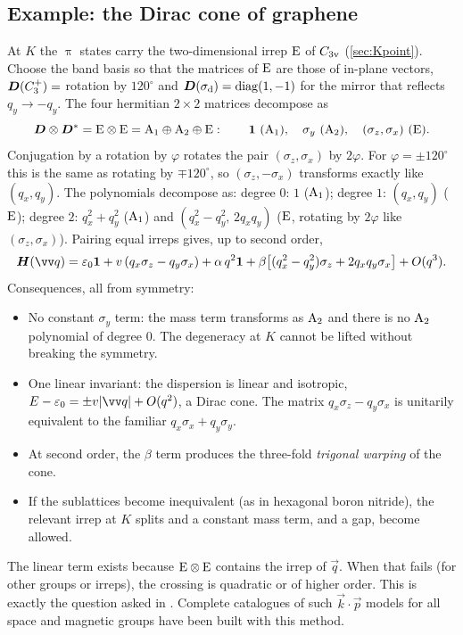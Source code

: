 \subsection{Example: the Dirac cone of graphene}
At $K$ the $\uppi$ states carry the two-dimensional irrep $\mathrm{E}$ of $C_{3\mathrm{v}}$
(\cref{sec:Kpoint}). Choose the band basis so that the matrices of $\mathrm{E}$ are those of
in-plane vectors, $\bm{D}(C_3^+)=$ rotation by $120^\circ$ and $\bm{D}(\sigma_{\mathrm{d}})=\operatorname{diag}(1,-1)$
for the mirror that reflects $q_y\to-q_y$. The four hermitian $2\times2$ matrices
decompose as
\[
\bm{D}\otimes\bm{D}^{*}=\mathrm{E}\otimes\mathrm{E}=\mathrm{A}_1\oplus\mathrm{A}_2\oplus\mathrm{E}:
\qquad \bm{1}\ (\mathrm{A}_1),\quad \sigma_y\ (\mathrm{A}_2),\quad (\sigma_z,\sigma_x)\ (\mathrm{E}).
\]
Conjugation by a rotation by $\varphi$ rotates the pair $(\sigma_z,\sigma_x)$ by
$2\varphi$. For $\varphi=\pm120^\circ$ this is the same as rotating by $\mp120^\circ$, so
$(\sigma_z,-\sigma_x)$ transforms exactly like $(q_x,q_y)$. The polynomials decompose as:
degree $0$: $1$ ($\mathrm{A}_1$); degree $1$: $(q_x,q_y)$ ($\mathrm{E}$); degree $2$:
$q_x^2+q_y^2$ ($\mathrm{A}_1$) and $(q_x^2-q_y^2,\,2q_xq_y)$ ($\mathrm{E}$, rotating by $2\varphi$
like $(\sigma_z,\sigma_x)$). Pairing equal irreps gives, up to second order,
\begin{equation}\label{eq:dirac}
\mat{H}(\vec{q})=\varepsilon_0\one
+v\,(q_x\sigma_z-q_y\sigma_x)
+\alpha\,q^2\one
+\beta\bigl[(q_x^2-q_y^2)\sigma_z+2q_xq_y\sigma_x\bigr]+O(q^3).
\end{equation}
Consequences, all from symmetry:
\begin{itemize}
\item No constant $\sigma_y$ term: the mass term transforms as $\mathrm{A}_2$ and there is no
      $\mathrm{A}_2$ polynomial of degree $0$. The degeneracy at $K$ cannot be lifted without
      breaking the symmetry.
\item One linear invariant: the dispersion is linear and isotropic,
      $E-\varepsilon_0=\pm v\abs{\vec{q}}+O(q^2)$, a Dirac cone. The matrix
      $q_x\sigma_z-q_y\sigma_x$ is unitarily equivalent to the familiar
      $q_x\sigma_x+q_y\sigma_y$.
\item At second order, the $\beta$ term produces the three-fold \emph{trigonal warping}
      of the cone.
\item If the sublattices become inequivalent (as in hexagonal boron nitride), the
      relevant irrep at $K$ splits and a constant mass term, and a gap, become allowed.
\end{itemize}
The linear term exists because $\mathrm{E}\otimes\mathrm{E}$ contains the irrep of $\vec{q}$. When
that fails (for other groups or irreps), the crossing is quadratic or of higher order.
This is exactly the question asked in . Complete catalogues of such
$\vec{k}\cdot\vec{p}$ models for all space and magnetic groups have been built with this
method.

